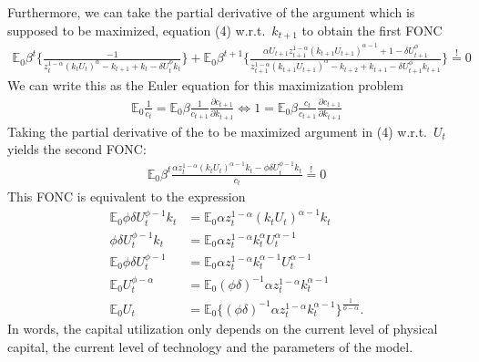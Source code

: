 \documentclass[a4paper]{article}
\theoremstyle{definition}
\begin{document}
Furthermore, we can take the partial derivative of the argument which is supposed to be maximized, equation (4) w.r.t.\ $k_{t+1}$ to obtain the first FONC
	\begin{align*}
	\mathbb E_0 \beta^t \Big\{ \frac{-1}{z_t^{1-\alpha}(k_t U_t)^\alpha - k_{t+1} + k_t - \delta U_t^\phi k_t} \Big\} + \mathbb E_0 \beta^{t+1} \Big\{ \frac{\alpha U_{t+1} z_{t+1}^{1-\alpha}(k_{t+1}U_{t+1})^{\alpha-1} + 1 - \delta U_{t+1}^\phi}{z_{t+1}^{1-\alpha}(k_{t+1}U_{t+1})^\alpha-k_{t+2}+k_{t+1}-\delta U_{t+1}^\phi k_{t+1}} \Big\} \overset{!}{=} 0 
	\end{align*}
We can write this as the Euler equation for this maximization problem
	\begin{align*}
	\mathbb E_0 \frac{1}{c_t} = \mathbb E_0 \beta \frac{1}{c_{t+1}} \frac{\partial c_{t+1}}{\partial k_{t+1}} \Leftrightarrow 1 = \mathbb E_0 \beta \frac{c_{t}}{c_{t+1}} \frac{\partial c_{t+1}}{\partial k_{t+1}}
	\end{align*}
Taking the partial derivative of the to be maximized argument in (4) w.r.t.\ $U_t$ yields the second FONC:
	\begin{align*}
	\mathbb E_0 \beta^t \frac{\alpha z_t^{1-\alpha}(k_t U_t)^{\alpha-1}k_t- \phi \delta U_t^{\phi-1}k_t}{c_t} \overset{!}{=} 0
	\end{align*}
This FONC is equivalent to the expression
	\begin{align*}
	\mathbb E_0 \phi \delta U_t^{\phi-1}k_t 	&= \mathbb E_0 \alpha z_t^{1-\alpha}(k_t U_t)^{\alpha-1}k_t \\
	\phi \delta U_t^{\phi-1}k_t 	&= \mathbb E_0 \alpha z_t^{1-\alpha} k_t^{\alpha}U_t^{\alpha-1} \\
	\mathbb E_0 \phi \delta U_t^{\phi-1} 		&=\mathbb E_0 \alpha z_t^{1-\alpha} k_t^{\alpha-1} U_t^{\alpha-1} \\
	\mathbb E_0 U_t^{\phi-\alpha} 				&=\mathbb E_0  (\phi \delta)^{-1}  \alpha z_t^{1-\alpha} k_t^{\alpha-1} \\
	\mathbb E_0 U_t 								&=\mathbb E_0  \Big\{ (\phi \delta)^{-1}  \alpha z_t^{1-\alpha} k_t^{\alpha-1} \Big\}^{\frac{1}{\phi-\alpha}}.
	\end{align*}
In words, the capital utilization only depends on the current level of physical capital, the current level of technology and the parameters of the model. 
\end{document}
